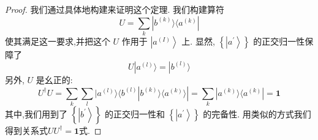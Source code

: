 	\begin{proof}
		我们通过具体地构建来证明这个定理. 我们构建算符
		\begin{equation}\label{1.115}
			U = \mathop{\sum }\limits_{k}| {b}^{( k) }\rangle \langle {a}^{( k) }|
		\end{equation}
		使其满足这一要求,并把这个 $U$ 作用于 $\left| {a}^{\left( I\right) }\right\rangle$ 上. 显然, $\left\{ \left| {a}^{\prime }\right\rangle \right\}$ 的正交归一性保障了
		\begin{equation}\label{1.116}
			U| {a}^{( l) }\rangle = | {b}^{( l) }\rangle
		\end{equation}
		另外, $U$ 是幺正的:
		\begin{equation}
			{U}^{ \dagger }U = \mathop{\sum }\limits_{k}\mathop{\sum }\limits_{l}| {a}^{( l) }\rangle \langle {{b}^{( l) }| {{b}^{( k) }\rangle \langle {a}^{( k) }\rangle }| = \mathop{\sum }\limits_{k}| {a}^{( k) }\rangle \langle {a}^{( k) }| = \textbf{1}}
		\end{equation}
		其中,我们用到了 $\left\{ \left| {b}^{\prime }\right\rangle \right\}$ 的正交归一性和 $\left\{ \left| {a}^{\prime }\right\rangle \right\}$ 的完备性. 用类似的方式我们得到关系式$U{U}^{ \dagger } = \textbf{1}$式.
	\end{proof}
